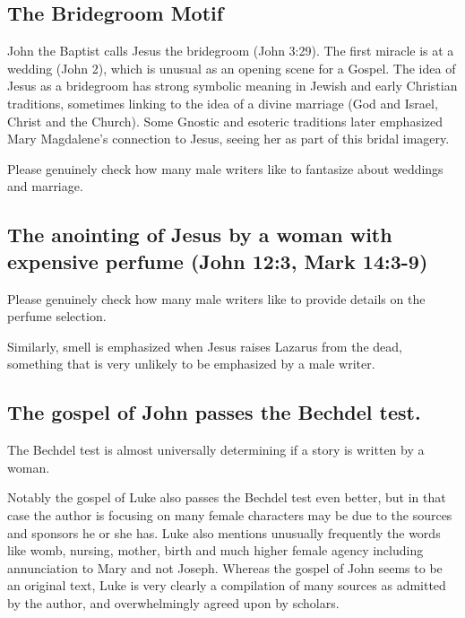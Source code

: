 \subsection{The Bridegroom Motif}\label{subsec:the-bridegroom-motif}

John the Baptist calls Jesus the bridegroom (John 3:29).
The first miracle is at a wedding (John 2), which is unusual as an opening scene for a Gospel.
The idea of Jesus as a bridegroom has strong symbolic meaning in Jewish and early Christian traditions, sometimes linking to the idea of a divine marriage (God and Israel, Christ and the Church).
Some Gnostic and esoteric traditions later emphasized Mary Magdalene's connection to Jesus, seeing her as part of this bridal imagery.

Please genuinely check how many male writers like to fantasize about weddings and marriage.

\subsection{The anointing of Jesus by a woman with expensive perfume (John 12:3, Mark 14:3-9)}\label{subsec:the-anointing-of-jesus-by-a-woman-with-expensive-perfume-john-123-mark-143-9}

Please genuinely check how many male writers like to provide details on the perfume selection.

Similarly, smell is emphasized when Jesus raises Lazarus from the dead, something that is very unlikely to be emphasized by a male writer.

\subsection{The gospel of John passes the Bechdel test.}\label{subsec:the-gospel-of-john-passes-the-bechdel-test.}

The Bechdel test is almost universally determining if a story is written by a woman.

Notably the gospel of Luke also passes the Bechdel test even better, but in that case the author is focusing on many female characters may be due to the sources and sponsors he or she has.
Luke also mentions unusually frequently the words like womb, nursing, mother, birth and much higher female agency including annunciation to Mary and not Joseph.
Whereas the gospel of John seems to be an original text, Luke is very clearly a compilation of many sources as admitted by the author, and overwhelmingly agreed upon by scholars.


